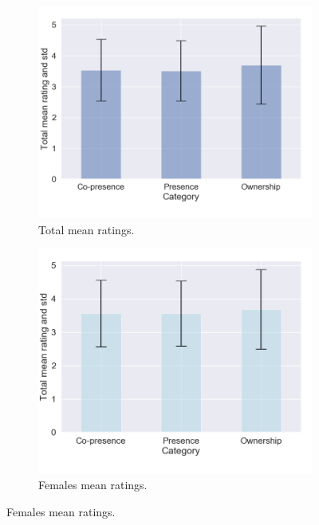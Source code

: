 \begin{figure}[H]
 \centering
 \hspace{-25mm}
 \begin{subfigure}[b]{0.5\textwidth}
 \includegraphics[scale=0.45]{Files/Plots/misc_all_mean.png}
 \caption{Total mean ratings.}
\label{fig:miscAll}
\end{subfigure}
 \hspace{20mm}
\begin{subfigure}[b]{0.5\textwidth}
 \centering
 \includegraphics[scale=0.45]{Files/Plots/misc_all_mean_f.png}
 \caption{Females mean ratings. }
 \label{fig:miscAllFemales}

\end{subfigure}
\end{figure}
